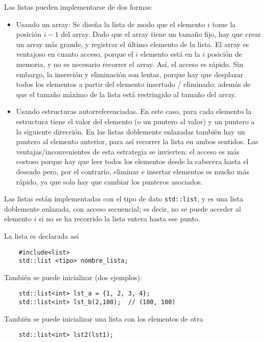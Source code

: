 \documentclass[a4paper]{article}
\begin{document}
	Las listas pueden implementarse de dos formas:
	\begin{itemize}
		\item Usando un array: Se diseña la lista de modo que el elemento $i$ tome la posición $i-1$ del array. Dado que el array tiene un tamaño fijo, hay que crear un array más grande, y registrar el último elemento de la lista. El array es ventajoso en cuanto acceso, porque el $i$ elemento está en la $i$ posición de memoria, y no es necesario recorrer el array. Así, el acceso es rápido. Sin embargo, la inserción y eliminación son lentas, porque hay que desplazar todos los elementos a partir del elemento insertado / eliminado; además de que el tamaño máximo de la lista está restringido al tamaño del array.
		\item Usando estructuras autorreferenciadas. En este caso, para cada elemento la estructura tiene el valor del elemento (o un puntero al valor) y un puntero a la siguiente dirección. En las listas doblemente enlazadas también hay un puntero al elemento anterior, para así recorrer la lista en ambos sentidos. Las ventajas/inconvenientes de esta estrategia se invierten: el acceso es más costoso porque hay que leer todos los elementos desde la cabecera hasta el deseado pero, por el contrario, eliminar e insertar elementos es mucho más rápido, ya que solo hay que cambiar los punteros asociados.
	\end{itemize}
	
	Las listas están implementadas con el tipo de dato \verb|std::list|, y es una lista doblemente enlazada, con acceso secuencial; es decir, no se puede acceder al elemento $i$ si no se ha recorrido la lista entera hasta ese punto.
	
	La lista es declarada así
	
	\begin{verbatim}
	#include<list>
	std::list <tipo> nombre_lista;
	\end{verbatim}
	
	También se puede inicializar (dos ejemplos):
	
	\begin{verbatim}
	std::list<int> lst_a = {1, 2, 3, 4};
	std::list<int> lst_b(2,100);  // (100, 100)
	\end{verbatim}
	
	También se puede inicializar una lista con los elementos de otra
	
	\begin{verbatim}
	std::list<int> lst2(lst1);
	\end{verbatim}
	
\end{document}
